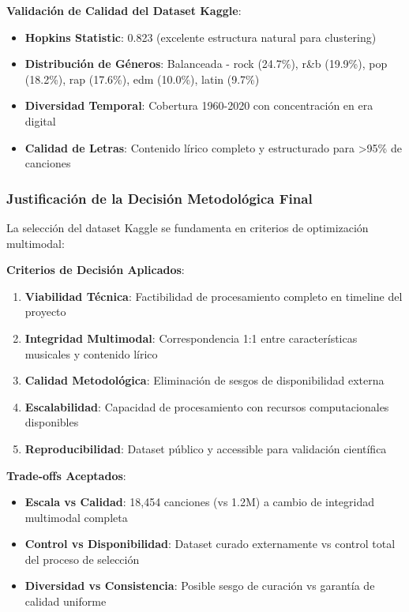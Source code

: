 \documentclass[12pt,a4paper]{report}
\begin{document}
\textbf{Validación de Calidad del Dataset Kaggle}:
\begin{itemize}
\item \textbf{Hopkins Statistic}: 0.823 (excelente estructura natural para clustering)
\item \textbf{Distribución de Géneros}: Balanceada - rock (24.7\%), r\&b (19.9\%), pop (18.2\%), rap (17.6\%), edm (10.0\%), latin (9.7\%)
\item \textbf{Diversidad Temporal}: Cobertura 1960-2020 con concentración en era digital
\item \textbf{Calidad de Letras}: Contenido lírico completo y estructurado para >95\% de canciones
\end{itemize}

\subsubsection{Justificación de la Decisión Metodológica Final}

La selección del dataset Kaggle se fundamenta en criterios de optimización multimodal:

\textbf{Criterios de Decisión Aplicados}:
\begin{enumerate}
\item \textbf{Viabilidad Técnica}: Factibilidad de procesamiento completo en timeline del proyecto
\item \textbf{Integridad Multimodal}: Correspondencia 1:1 entre características musicales y contenido lírico
\item \textbf{Calidad Metodológica}: Eliminación de sesgos de disponibilidad externa
\item \textbf{Escalabilidad}: Capacidad de procesamiento con recursos computacionales disponibles
\item \textbf{Reproducibilidad}: Dataset público y accessible para validación científica
\end{enumerate}

\textbf{Trade-offs Aceptados}:
\begin{itemize}
\item \textbf{Escala vs Calidad}: 18,454 canciones (vs 1.2M) a cambio de integridad multimodal completa
\item \textbf{Control vs Disponibilidad}: Dataset curado externamente vs control total del proceso de selección
\item \textbf{Diversidad vs Consistencia}: Posible sesgo de curación vs garantía de calidad uniforme
\end{itemize}
\end{document}
